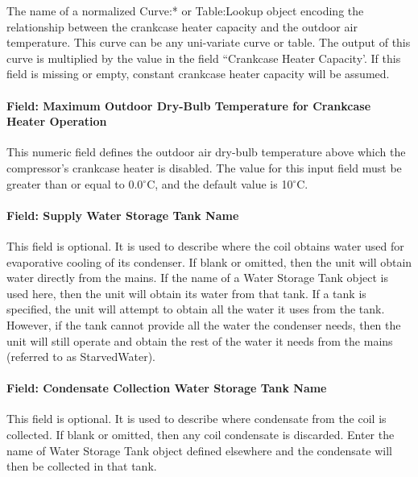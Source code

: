 The name of a normalized Curve:* or Table:Lookup object encoding the relationship between the crankcase heater capacity and the outdoor air temperature. This curve can be any uni-variate curve or table. The output of this curve is multiplied by the value in the field ``Crankcase Heater Capacity'. If this field is missing or empty, constant crankcase heater capacity will be
assumed.

\paragraph{Field: Maximum Outdoor Dry-Bulb Temperature for Crankcase Heater Operation}\label{field-maximum-outdoor-dry-bulb-temperature-for-crankcase-heater-operation}

This numeric field defines the outdoor air dry-bulb temperature above which the compressor's crankcase heater is disabled. The value for this input field must be greater than or equal to 0.0$^\circ$C, and the default value is 10$^\circ$C.

\paragraph{Field: Supply Water Storage Tank Name}\label{field-supply-water-storage-tank-name-000}

This field is optional. It is used to describe where the coil obtains water used for evaporative cooling of its condenser. If blank or omitted, then the unit will obtain water directly from the mains. If the name of a Water Storage Tank object is used here, then the unit will obtain its water from that tank. If a tank is specified, the unit will attempt to obtain all the water it uses from the tank. However, if the tank cannot provide all the water the condenser needs, then the unit will still operate and obtain the rest of the water it needs from the mains (referred to as StarvedWater).

\paragraph{Field: Condensate Collection Water Storage Tank Name}\label{field-condensate-collection-water-storage-tank-name-2}

This field is optional. It is used to describe where condensate from the coil is collected. If blank or omitted, then any coil condensate is discarded. Enter the name of Water Storage Tank object defined elsewhere and the condensate will then be collected in that tank.


